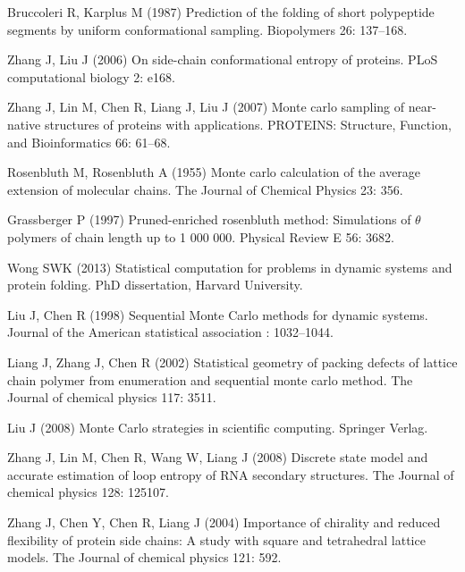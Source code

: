 \begin{thebibliography}{10}
Bruccoleri R, Karplus M (1987) Prediction of the folding of short
polypeptide
  segments by uniform conformational sampling.
\newblock Biopolymers 26: 137--168.

Zhang J, Liu J (2006) On side-chain conformational entropy of
proteins.
\newblock PLoS computational biology 2: e168.

Zhang J, Lin M, Chen R, Liang J, Liu J (2007) Monte carlo sampling
of
  near-native structures of proteins with applications.
\newblock PROTEINS: Structure, Function, and Bioinformatics 66: 61--68.

Rosenbluth M, Rosenbluth A (1955) Monte carlo calculation of the
average
  extension of molecular chains.
\newblock The Journal of Chemical Physics 23: 356.

Grassberger P (1997) Pruned-enriched rosenbluth method: Simulations
of $\theta$
  polymers of chain length up to 1 000 000.
\newblock Physical Review E 56: 3682.

Wong SWK (2013) Statistical computation for problems in dynamic
systems and protein folding.
\newblock  PhD dissertation, Harvard University.

Liu J, Chen R (1998) Sequential {M}onte {C}arlo methods for dynamic
systems.
\newblock Journal of the American statistical association : 1032--1044.

Liang J, Zhang J, Chen R (2002) Statistical geometry of packing
defects of
  lattice chain polymer from enumeration and sequential monte carlo method.
\newblock The Journal of chemical physics 117: 3511.

Liu J (2008) Monte Carlo strategies in scientific computing.
\newblock Springer Verlag.

Zhang J, Lin M, Chen R, Wang W, Liang J (2008) Discrete state model
and
  accurate estimation of loop entropy of {RNA} secondary structures.
\newblock The Journal of chemical physics 128: 125107.

Zhang J, Chen Y, Chen R, Liang J (2004) Importance of chirality and
reduced
  flexibility of protein side chains: A study with square and tetrahedral
  lattice models.
\newblock The Journal of chemical physics 121: 592.


\end{thebibliography}
